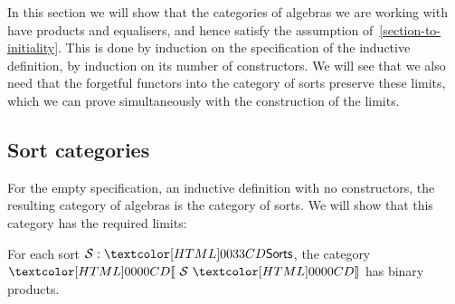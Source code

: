 In this section we will show that the categories of algebras we are
working with have products and equalisers, and hence satisfy the
assumption of~\cref{section-to-initiality}. This is done by induction
on the specification of the inductive definition, \ie by induction on
its number of constructors. We will see that we also need that the
forgetful functors into the category of sorts preserve these limits,
which we can prove simultaneously with the construction of the limits.

\subsection{Sort categories}

For the empty specification, an inductive definition with no
constructors, the resulting category of algebras is the category of
sorts. We will show that this category has the required limits:

\begin{lemma}
  \label{sorts-products}
  For each sort $\Ss : \sortsty$, the category $\SortCat{\Ss}$ has
  binary products.
\end{lemma}

